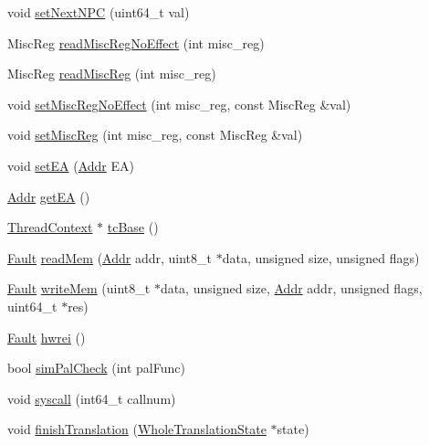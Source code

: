\begin{DoxyCompactItemize}
\item 
void \hyperlink{classExecContext_ad9318b66094af0afc4246ccce9fafe0b}{setNextNPC} (uint64\_\-t val)
\item 
MiscReg \hyperlink{classExecContext_a7b5ac6af9c2c19d7c1b442b8a3aebbc6}{readMiscRegNoEffect} (int misc\_\-reg)
\item 
MiscReg \hyperlink{classExecContext_a5a8c6c487e8da143d26188258b04f1cc}{readMiscReg} (int misc\_\-reg)
\item 
void \hyperlink{classExecContext_a763517aaea2f3decbc1ef9d064216b6f}{setMiscRegNoEffect} (int misc\_\-reg, const MiscReg \&val)
\item 
void \hyperlink{classExecContext_a1877dde4f3eb17a8b7d33ea40176c148}{setMiscReg} (int misc\_\-reg, const MiscReg \&val)
\item 
void \hyperlink{classExecContext_a2f9742f8d2bcf6a31ebfc121fd9d5fbc}{setEA} (\hyperlink{base_2types_8hh_af1bb03d6a4ee096394a6749f0a169232}{Addr} EA)
\item 
\hyperlink{base_2types_8hh_af1bb03d6a4ee096394a6749f0a169232}{Addr} \hyperlink{classExecContext_a840be0f7fe0a7a50b37b0552fe6ca506}{getEA} ()
\item 
\hyperlink{classThreadContext}{ThreadContext} $\ast$ \hyperlink{classExecContext_ad33756f3e96ee445dca8d69b1dd8709c}{tcBase} ()
\item 
\hyperlink{classRefCountingPtr}{Fault} \hyperlink{classExecContext_a66191b2d8a45050b7df3c3efa7bb07c6}{readMem} (\hyperlink{base_2types_8hh_af1bb03d6a4ee096394a6749f0a169232}{Addr} addr, uint8\_\-t $\ast$data, unsigned size, unsigned flags)
\item 
\hyperlink{classRefCountingPtr}{Fault} \hyperlink{classExecContext_ad46c5edeb1ee9b60445f3e26364e2c5e}{writeMem} (uint8\_\-t $\ast$data, unsigned size, \hyperlink{base_2types_8hh_af1bb03d6a4ee096394a6749f0a169232}{Addr} addr, unsigned flags, uint64\_\-t $\ast$res)
\item 
\hyperlink{classRefCountingPtr}{Fault} \hyperlink{classExecContext_a5f42e07ae335dff417664e91518c7f1e}{hwrei} ()
\item 
bool \hyperlink{classExecContext_a461205960be9d52e9beda48a77e9c600}{simPalCheck} (int palFunc)
\item 
void \hyperlink{classExecContext_a36e0b96120fcbbc2ee8699158f7be5c2}{syscall} (int64\_\-t callnum)
\item 
void \hyperlink{classExecContext_a36c2a28eca3086b67fc7168a37367e98}{finishTranslation} (\hyperlink{classWholeTranslationState}{WholeTranslationState} $\ast$state)
\end{DoxyCompactItemize}


